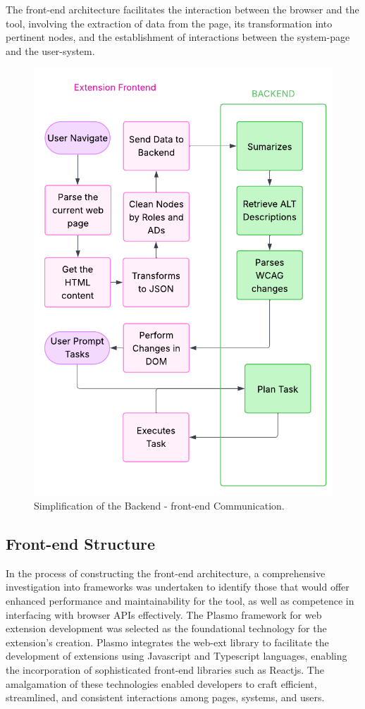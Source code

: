 \documentclass[conference]{IEEEtran}
\begin{document}
The front-end architecture facilitates the interaction between the browser and the tool, involving the extraction of data from the page, its transformation into pertinent nodes, and the establishment of interactions between the system-page and the user-system.

\begin{figure}[h]
\centering
\includegraphics[width=\columnwidth]{images/5.pdf}
\caption{Simplification of the Backend - front-end Communication.}
\label{fig:communication}
\end{figure}

\subsection{Front-end Structure}

In the process of constructing the front-end architecture, a comprehensive investigation into frameworks was undertaken to identify those that would offer enhanced performance and maintainability for the tool, as well as competence in interfacing with browser APIs effectively. The Plasmo framework for web extension development was selected as the foundational technology for the extension's creation. Plasmo integrates the web-ext library to facilitate the development of extensions using Javascript and Typescript languages, enabling the incorporation of sophisticated front-end libraries such as Reactjs. The amalgamation of these technologies enabled developers to craft efficient, streamlined, and consistent interactions among pages, systems, and users.
\end{document}
